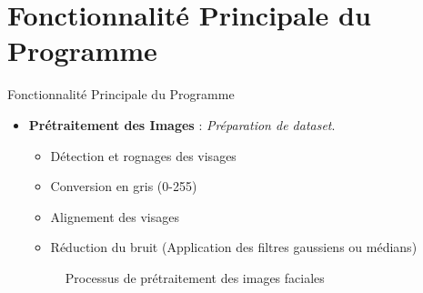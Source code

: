 \documentclass{beamer}
\begin{document}
\section{Fonctionnalité Principale du Programme}
\begin{frame}{Fonctionnalité Principale du Programme}
    \begin{itemize}
        \item \textbf{Prétraitement des Images} : \textit{Préparation de dataset}.
        \begin{itemize}
            \item Détection et rognages des visages
            \item Conversion en gris (0-255)
            \item Alignement des visages
            \item Réduction du bruit (Application des filtres gaussiens ou médians)
        \end{itemize}

        \vspace{0.2cm}
        \begin{figure}[ht]
            \centering
            \caption{Processus de prétraitement des images faciales}
            \label{fig:preprocessing_flow}
        \end{figure}
    \end{itemize}
\end{frame}
\end{document}
